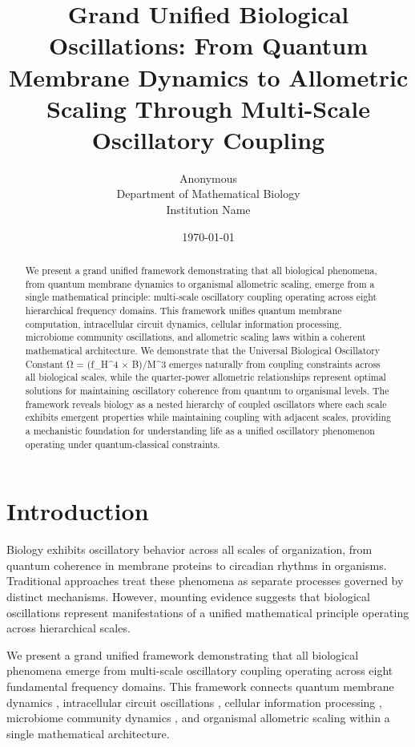 \documentclass[twocolumn]{article}
\title{Grand Unified Biological Oscillations: From Quantum Membrane Dynamics to Allometric Scaling Through Multi-Scale Oscillatory Coupling}
\author{
Anonymous\\
Department of Mathematical Biology\\
Institution Name
}
\date{\today}
\begin{document}
\maketitle

\begin{abstract}
We present a grand unified framework demonstrating that all biological phenomena, from quantum membrane dynamics to organismal allometric scaling, emerge from a single mathematical principle: multi-scale oscillatory coupling operating across eight hierarchical frequency domains. This framework unifies quantum membrane computation, intracellular circuit dynamics, cellular information processing, microbiome community oscillations, and allometric scaling laws within a coherent mathematical architecture. We demonstrate that the Universal Biological Oscillatory Constant Ω = (f_H^4 × B)/M^3 emerges naturally from coupling constraints across all biological scales, while the quarter-power allometric relationships represent optimal solutions for maintaining oscillatory coherence from quantum to organismal levels. The framework reveals biology as a nested hierarchy of coupled oscillators where each scale exhibits emergent properties while maintaining coupling with adjacent scales, providing a mechanistic foundation for understanding life as a unified oscillatory phenomenon operating under quantum-classical constraints.
\end{abstract}

\section{Introduction}

Biology exhibits oscillatory behavior across all scales of organization, from quantum coherence in membrane proteins to circadian rhythms in organisms. Traditional approaches treat these phenomena as separate processes governed by distinct mechanisms. However, mounting evidence suggests that biological oscillations represent manifestations of a unified mathematical principle operating across hierarchical scales.

We present a grand unified framework demonstrating that all biological phenomena emerge from multi-scale oscillatory coupling operating across eight fundamental frequency domains. This framework connects quantum membrane dynamics \citep{sachikonye2024membrane}, intracellular circuit oscillations \citep{sachikonye2024nebuchadnezzar}, cellular information processing \citep{sachikonye2024genome}, microbiome community dynamics \citep{thaiss2014transkingdom}, and organismal allometric scaling \citep{west1997general} within a single mathematical architecture.
\end{document}
